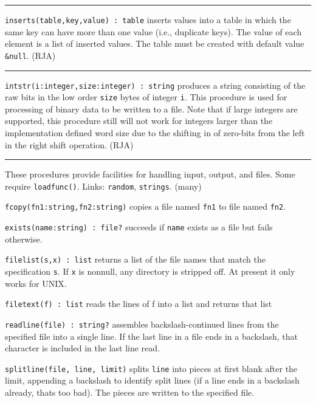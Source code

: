 \vspace{0.25cm}\hrule{}

\texttt{inserts(table,key,value) : table} inserts values into a table in
which the same key can have more than one value (i.e.,
duplicate keys). The value of each element is a
list of inserted values. The table must be created with default value
\texttt{\&null}. (RJA)

\vspace{0.25cm}\hrule{}

\texttt{intstr(i:integer,size:integer) : string} produces a string
consisting of the raw bits in the low order \texttt{size} bytes of
integer \texttt{i}. This procedure is used for processing of
binary data to be written to a file. Note that if
large integers are supported, this procedure still will not work for
integers larger than the implementation defined word size due to the
shifting in of zero-bits from the left in the right shift operation.
(RJA)

\vspace{0.25cm}\hrule{}

These procedures provide facilities for handling input,
output, and files. Some require
\texttt{loadfunc()}. Links: \texttt{random}, \texttt{strings}. (many)

\texttt{fcopy(fn1:string,fn2:string)} copies a file named \texttt{fn1}
to file named \texttt{fn2}.

\texttt{exists(name:string) : file?} succeeds if \texttt{name} exists as
a file but fails otherwise.

\texttt{filelist(s,x) : list} returns a list of the file names that
match the specification \texttt{s}. If \texttt{x} is nonnull, any
directory is stripped off. At present it only works for UNIX.

\texttt{filetext(f) : list} reads the lines of f into a list and returns
that list

\texttt{readline(file) : string?} assembles backslash-continued lines
from the specified file into a single line. If the last line in a file
ends in a backslash, that character is included in the last line read.

\texttt{splitline(file, line, limit)} splits \texttt{line} into pieces
at first blank after the limit, appending a backslash to identify split
lines (if a line ends in a backslash already, that{\textquotesingle}s
too bad). The pieces are written to the specified file.

